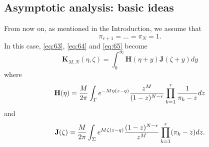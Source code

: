 \documentclass[11pt]{article}
\begin{document}
\subsection{Asymptotic analysis: basic ideas}\label{sec:basicas}


From now on, as mentioned in the Introduction, we assume that
\begin{equation}
  \pi_{r+1}=\dots = \pi_N=1.
\end{equation}
In this case, \eqref{eq:63}, \eqref{eq:64} and \eqref{eq:65} become
\begin{equation}\label{eq:KinHJ}
  \mathbf{K}_{M,N}(\eta,\zeta) =\int_0^\infty \mathbf{H}(\eta+y)
  \mathbf{J}(\zeta+y) dy
\end{equation}
where
\begin{equation}
  \mathbf{H}(\eta) = \frac{M}{2\pi} \int_\Gamma e^{-M\eta (z-q)}
  \frac{z^M}{(1-z)^{N-r}}
  \prod_{k=1}^r \frac1{\pi_k-z} dz
\end{equation}
and
\begin{equation}
  \mathbf{J}(\zeta) = \frac{M}{2\pi} \int_\Sigma
  e^{M\zeta (z-q)}\frac{(1-z)^{N-r}}{z^M}
  \prod_{k=1}^r (\pi_k-z) dz.
\end{equation}
\end{document}
